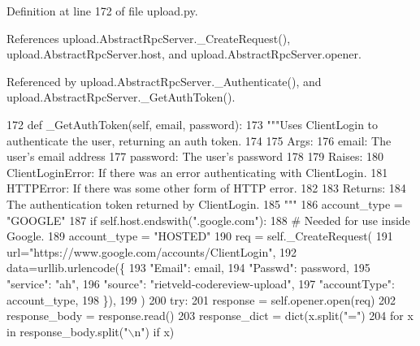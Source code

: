 Definition at line 172 of file upload.\+py.



References upload.\+Abstract\+Rpc\+Server.\+\_\+\+Create\+Request(), upload.\+Abstract\+Rpc\+Server.\+host, and upload.\+Abstract\+Rpc\+Server.\+opener.



Referenced by upload.\+Abstract\+Rpc\+Server.\+\_\+\+Authenticate(), and upload.\+Abstract\+Rpc\+Server.\+\_\+\+Get\+Auth\+Token().


\begin{DoxyCode}
172   \textcolor{keyword}{def }\_GetAuthToken(self, email, password):
173     \textcolor{stringliteral}{"""Uses ClientLogin to authenticate the user, returning an auth token.}
174 \textcolor{stringliteral}{}
175 \textcolor{stringliteral}{    Args:}
176 \textcolor{stringliteral}{      email:    The user's email address}
177 \textcolor{stringliteral}{      password: The user's password}
178 \textcolor{stringliteral}{}
179 \textcolor{stringliteral}{    Raises:}
180 \textcolor{stringliteral}{      ClientLoginError: If there was an error authenticating with ClientLogin.}
181 \textcolor{stringliteral}{      HTTPError: If there was some other form of HTTP error.}
182 \textcolor{stringliteral}{}
183 \textcolor{stringliteral}{    Returns:}
184 \textcolor{stringliteral}{      The authentication token returned by ClientLogin.}
185 \textcolor{stringliteral}{    """}
186     account\_type = \textcolor{stringliteral}{"GOOGLE"}
187     \textcolor{keywordflow}{if} self.host.endswith(\textcolor{stringliteral}{".google.com"}):
188       \textcolor{comment}{# Needed for use inside Google.}
189       account\_type = \textcolor{stringliteral}{"HOSTED"}
190     req = self.\_CreateRequest(
191         url=\textcolor{stringliteral}{"https://www.google.com/accounts/ClientLogin"},
192         data=urllib.urlencode(\{
193             \textcolor{stringliteral}{"Email"}: email,
194             \textcolor{stringliteral}{"Passwd"}: password,
195             \textcolor{stringliteral}{"service"}: \textcolor{stringliteral}{"ah"},
196             \textcolor{stringliteral}{"source"}: \textcolor{stringliteral}{"rietveld-codereview-upload"},
197             \textcolor{stringliteral}{"accountType"}: account\_type,
198         \}),
199     )
200     \textcolor{keywordflow}{try}:
201       response = self.opener.open(req)
202       response\_body = response.read()
203       response\_dict = dict(x.split(\textcolor{stringliteral}{"="})
204                            \textcolor{keywordflow}{for} x \textcolor{keywordflow}{in} response\_body.split(\textcolor{stringliteral}{"\(\backslash\)n"}) \textcolor{keywordflow}{if} x)

\end{DoxyCode}
